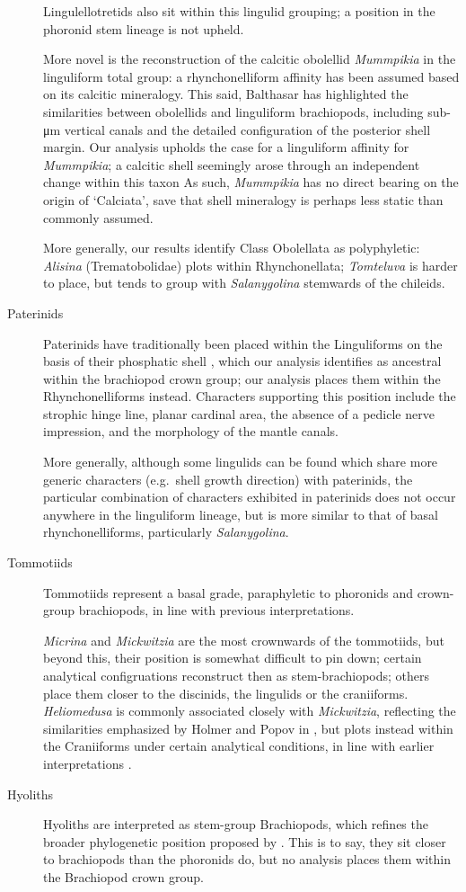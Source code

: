 \documentclass[]{book}
\theoremstyle{definition}
\theoremstyle{definition}
\theoremstyle{definition}
\theoremstyle{remark}
\begin{document}
\begin{description}
Lingulellotretids also sit within this lingulid grouping; a position in
the phoronid stem lineage \citep[advocated
by][]{Balthasar2009EarlyCambrian} is not upheld.

More novel is the reconstruction of the calcitic obolellid
\emph{Mummpikia} in the linguliform total group: a rhynchonelliform
affinity has been assumed based on its calcitic mineralogy. This said,
Balthasar \citeyearpar{Balthasar2008iMummpikia} has highlighted the
similarities between obolellids and linguliform brachiopods, including
sub-μm vertical canals and the detailed configuration of the posterior
shell margin. Our analysis upholds the case for a linguliform affinity
for \emph{Mummpikia}; a calcitic shell seemingly arose through an
independent change within this taxon As such, \emph{Mummpikia} has no
direct bearing on the origin of `Calciata', save that shell mineralogy
is perhaps less static than commonly assumed.

More generally, our results identify Class Obolellata as polyphyletic:
\emph{Alisina} (Trematobolidae) plots within Rhynchonellata;
\emph{Tomteluva} is harder to place, but tends to group with
\emph{Salanygolina} stemwards of the chileids.
\item[Paterinids]
Paterinids have traditionally been placed within the Linguliforms on the
basis of their phosphatic shell \citep{Williams2007PartH}, which our
analysis identifies as ancestral within the brachiopod crown group; our
analysis places them within the Rhynchonelliforms instead. Characters
supporting this position include the strophic hinge line, planar
cardinal area, the absence of a pedicle nerve impression, and the
morphology of the mantle canals.

More generally, although some lingulids can be found which share more
generic characters (e.g.~shell growth direction) with paterinids, the
particular combination of characters exhibited in paterinids does not
occur anywhere in the linguliform lineage, but is more similar to that
of basal rhynchonelliforms, particularly \emph{Salanygolina}.
\item[Tommotiids]
Tommotiids represent a basal grade, paraphyletic to phoronids and
crown-group brachiopods, in line with previous interpretations.

\emph{Micrina} and \emph{Mickwitzia} are the most crownwards of the
tommotiids, but beyond this, their position is somewhat difficult to pin
down; certain analytical configruations reconstruct then as
stem-brachiopods; others place them closer to the discinids, the
lingulids or the craniiforms. \emph{Heliomedusa} is commonly associated
closely with \emph{Mickwitzia}, reflecting the similarities emphasized
by Holmer and Popov in \citet{Williams2007PartH}, but plots instead
within the Craniiforms under certain analytical conditions, in line with
earlier interpretations \citep{Williams2000BrachiopodaLinguliformea}.
\item[Hyoliths]
Hyoliths are interpreted as stem-group Brachiopods, which refines the
broader phylogenetic position proposed by
\citet{Moysiuk2017Hyolithsare}. This is to say, they sit closer to
brachiopods than the phoronids do, but no analysis places them within
the Brachiopod crown group.


\end{description}
\end{document}
